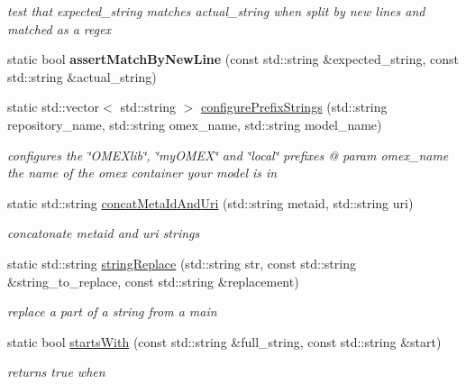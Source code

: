 \begin{DoxyCompactItemize}
\begin{DoxyCompactList}\small\item\em test that expected\+\_\+string matches actual\+\_\+string when split by new lines and matched as a regex \end{DoxyCompactList}\item 
\mbox{\label{classomexmeta_1_1OmexMetaUtils_a6ddc16d56f238ef7ff3c8ab355163ef7}} 
static bool {\bfseries assert\+Match\+By\+New\+Line} (const std\+::string \&expected\+\_\+string, const std\+::string \&actual\+\_\+string)
\item 
static std\+::vector$<$ std\+::string $>$ \hyperlink{classomexmeta_1_1OmexMetaUtils_a744a0575136f1cc60b76a6560a5595e9}{configure\+Prefix\+Strings} (std\+::string repository\+\_\+name, std\+::string omex\+\_\+name, std\+::string model\+\_\+name)
\begin{DoxyCompactList}\small\item\em configures the \char`\"{}\+O\+M\+E\+Xlib\char`\"{}, \char`\"{}my\+O\+M\+E\+X\char`\"{} and \char`\"{}local\char`\"{} prefixes @ param omex\+\_\+name the name of the omex container your model is in \end{DoxyCompactList}\item 
static std\+::string \hyperlink{classomexmeta_1_1OmexMetaUtils_ae645af49ce57dac8bd0e0eba9e39a6c0}{concat\+Meta\+Id\+And\+Uri} (std\+::string metaid, std\+::string uri)
\begin{DoxyCompactList}\small\item\em concatonate metaid and uri strings \end{DoxyCompactList}\item 
static std\+::string \hyperlink{classomexmeta_1_1OmexMetaUtils_aca2230ca99338b9dc0fc7d296b0c553b}{string\+Replace} (std\+::string str, const std\+::string \&string\+\_\+to\+\_\+replace, const std\+::string \&replacement)
\begin{DoxyCompactList}\small\item\em replace a part of a string  from a main \end{DoxyCompactList}\item 
static bool \hyperlink{classomexmeta_1_1OmexMetaUtils_a66d58e0ebcbee1857b23ead70c87de7f}{starts\+With} (const std\+::string \&full\+\_\+string, const std\+::string \&start)
\begin{DoxyCompactList}\small\item\em returns true when \end{DoxyCompactList}\item 

\end{DoxyCompactItemize}
